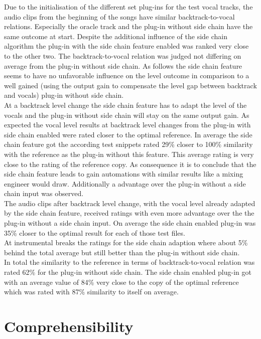 Due to the initialisation of the different set plug-ins for the test vocal tracks, the audio clips from the beginning of the songs have similar backtrack-to-vocal relations. Especially the oracle track and the plug-in without side chain have the same outcome at start. Despite the additional influence of the side chain algorithm the plug-in with the side chain feature enabled was ranked very close to the other two. The backtrack-to-vocal relation was judged not differing on average from the plug-in without side chain. As follows the side chain feature seems to have no unfavorable influence on the level outcome in comparison to a well gained (using the output gain to compensate the level gap between backtrack and vocals) plug-in without side chain.\\
At a backtrack level change the side chain feature has to adapt the level of the vocals and the plug-in without side chain will stay on the same output gain. As expected the vocal level results at backtrack level changes from the plug-in with side chain enabled were rated closer to the optimal reference. In average the side chain feature got the according test snippets rated 29\% closer to 100\% similarity with the reference as the plug-in without this feature. This average rating is very close to the rating of the reference copy. As consequence it is to conclude that the side chain feature leads to gain automations with similar results like a mixing engineer would draw. Additionally a advantage over the plug-in without a side chain input was observed.\\
The audio clips after backtrack level change, with the vocal level already adapted by the side chain feature, received ratings with even more advantage over the the plug-in without a side chain input. On average the side chain enabled plug-in was 35\% closer to the optimal result for each of those test files.\\
At instrumental breaks the ratings for the side chain adaption where about 5\% behind the total average but still better than the plug-in without side chain.\\
In total the similarity to the reference in terms of backtrack-to-vocal relation was rated 62\% for the plug-in without side chain. The side chain enabled plug-in got with an average value of 84\% very close to the copy of the optimal reference which was rated with 87\% similarity to itself on average.\\

\section{Comprehensibility}

